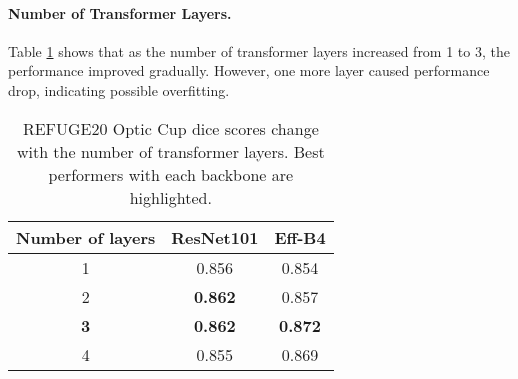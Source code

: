 \documentclass{article}
\begin{document}
\paragraph{Number of Transformer Layers.} 
Table \ref{num-layers} shows that as the number of transformer layers increased from 1 to 3, the performance improved gradually. However, one more layer caused performance drop, indicating possible overfitting.

\begin{table}[h]
\begin{centering}
\begin{tabular}{|c|c|c|}
\hline 
Number of layers & ResNet101 & Eff-B4 \tabularnewline
\hline 
1 & 0.856 & 0.854 \tabularnewline
\hline 
2 & \textbf{0.862} & 0.857 \tabularnewline
\hline
\textbf{3} & \textbf{0.862} &  \textbf{0.872} \tabularnewline
\hline
4 & 0.855 &  0.869 \tabularnewline
\hline 
\end{tabular}
\caption{REFUGE20 Optic Cup dice scores change with the number of transformer layers. Best performers with each backbone are highlighted.}
\label{num-layers}
\par\end{centering}
\end{table}
\end{document}
